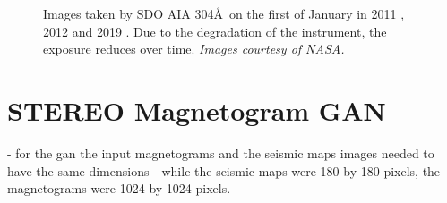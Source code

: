 \documentclass[a4paper,10pt]{report}
\begin{document}
 \begin{figure}[t]%
  \centering
  \qquad
  \qquad
  \caption[]{
    Images taken by SDO AIA 304\AA \ on the first of January in
    2011 , 2012  and 2019
    . Due to the degradation of the instrument, the
    exposure reduces over time. \textit{Images courtesy of NASA.}}
  \label{fig:aia_degradation}
\end{figure}


\section{STEREO Magnetogram GAN}
- for the gan the input magnetograms and the seismic maps images needed to have
the same dimensions
- while the seismic maps were 180 by 180 pixels, the magnetograms were 1024 by
1024 pixels.

\end{document}
